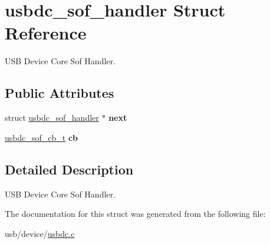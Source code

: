 \hypertarget{structusbdc__sof__handler}{}\section{usbdc\+\_\+sof\+\_\+handler Struct Reference}
\label{structusbdc__sof__handler}


U\+SB Device Core Sof Handler.  


\subsection*{Public Attributes}
\begin{DoxyCompactItemize}
\item 
\mbox{\label{structusbdc__sof__handler_a8cba42a464a1150aafb1c42391984d6a}} 
struct \hyperlink{structusbdc__sof__handler}{usbdc\+\_\+sof\+\_\+handler} $\ast$ {\bfseries next}
\item 
\mbox{\label{structusbdc__sof__handler_ae64bc2aed23119e3e2ea3c714d79043b}} 
\hyperlink{usbdc_8h_a132c960ad2a21fdd3f96c614543d546f}{usbdc\+\_\+sof\+\_\+cb\+\_\+t} {\bfseries cb}
\end{DoxyCompactItemize}


\subsection{Detailed Description}
U\+SB Device Core Sof Handler. 

The documentation for this struct was generated from the following file\+:\begin{DoxyCompactItemize}
\item 
usb/device/\hyperlink{usbdc_8c}{usbdc.\+c}\end{DoxyCompactItemize}
